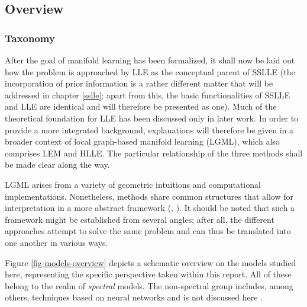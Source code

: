 \subsection{Overview}
\label{principles-overview}


\subsubsection{Taxonomy}
\label{taxonomy}

After the goal of manifold learning has been formalized, it shall now be laid 
out how the problem is approached by LLE as the conceptual parent of SSLLE 
(the incorporation of prior information is a rather different matter that will 
be addressed in chapter \ref{sslle}; apart from this, the basic functionalities 
of SSLLE and LLE are identical and will therefore be presented as one). 
Much of the theoretical foundation for LLE has been discussed only in later 
work.
In order to provide a more integrated background, explanations will therefore be 
given in a broader context of local graph-based manifold learning (LGML), which 
also comprises LEM and HLLE.
The particular relationship of the three methods shall be made clear along the 
way.

LGML arises from a variety of geometric 
intuitions and computational implementations.
Nonetheless, methods share common structures that allow for interpretation in a 
more abstract framework (\citet{bengioetal2003}, \citet{bengioetal2004}).
It should be noted that such a framework might be established from several 
angles; after all, the different approaches attempt to solve the same problem 
and can thus be translated into one another in various ways.

Figure \ref{fig-models-overview} depicts a schematic overview on the models 
studied here, representing the specific perspective taken within this report.
All of these belong to the realm of \textit{spectral} models.
The non-spectral group includes, among others, techniques based on neural 
networks and is not discussed here \citep{vandermaatenetal2009}.

